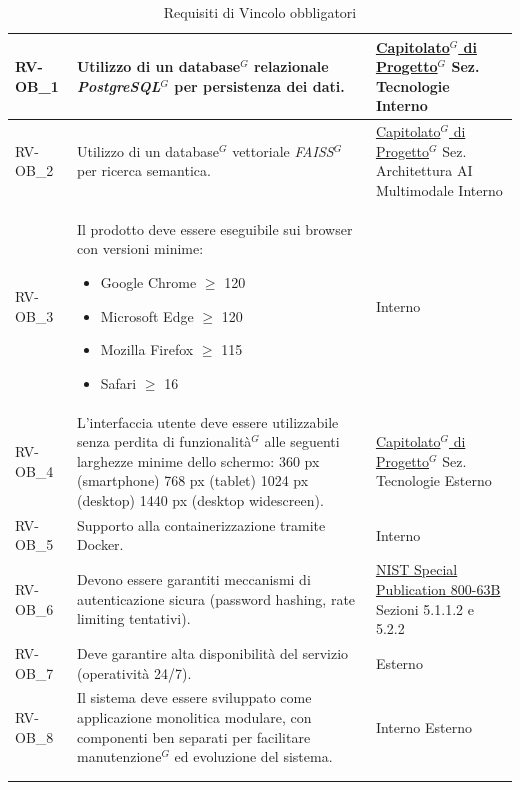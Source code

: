 \begin{longtable}{|>{\raggedright}p{}|>{\raggedright\arraybackslash}p{}|>{\raggedright\arraybackslash}p{}|}
    RV-OB\_1 & Utilizzo di un database$^G$ relazionale \textit{PostgreSQL$^G$} per persistenza dei dati. &  \href{https://www.math.unipd.it/~tullio/IS-1/2025/Progetto/C8.pdf}{Capitolato$^G$ di Progetto$^G$} \newline Sez. Tecnologie \newline Interno \\
    \hline
    RV-OB\_2 & Utilizzo di un database$^G$ vettoriale \textit{FAISS$^G$} per ricerca semantica. & \href{https://www.math.unipd.it/~tullio/IS-1/2025/Progetto/C8.pdf}{Capitolato$^G$ di Progetto$^G$} \newline Sez. Architettura AI Multimodale \newline Interno \\
    \hline
    RV-OB\_3 & Il prodotto deve essere eseguibile sui browser con versioni minime: \begin{itemize}
        \item Google Chrome $\ge$ 120
        \item Microsoft Edge $\ge$ 120
        \item Mozilla Firefox $\ge$ 115
        \item Safari $\ge$ 16
    \end{itemize} & Interno \\
    \hline
    RV-OB\_4 & L'interfaccia utente deve essere utilizzabile senza perdita di funzionalità$^G$ alle seguenti larghezze minime dello schermo: 360 px (smartphone) 768 px (tablet) 1024 px (desktop) 1440 px (desktop widescreen). &  \href{https://www.math.unipd.it/~tullio/IS-1/2025/Progetto/C8.pdf}{Capitolato$^G$ di Progetto$^G$} \newline Sez. Tecnologie \newline Esterno \\
    \hline
    RV-OB\_5 & Supporto alla containerizzazione tramite Docker. & Interno \\
    \hline
    RV-OB\_6 & Devono essere garantiti meccanismi di autenticazione sicura (password hashing, rate limiting tentativi). & \href{https://pages.nist.gov/800-63-3/sp800-63b.html#sfcs}{NIST Special Publication 800-63B} Sezioni 5.1.1.2 e 5.2.2 \\
    \hline
    RV-OB\_7 & Deve garantire alta disponibilità del servizio (operatività 24/7). & Esterno \\
    \hline
    RV-OB\_8 & Il sistema deve essere sviluppato come applicazione monolitica modulare, con componenti ben separati per facilitare manutenzione$^G$ ed evoluzione del sistema. & Interno \newline Esterno \\
    \hline
    
    \multicolumn{3}{c}{} \\
    \caption{Requisiti di Vincolo obbligatori}\label{tab:vincolo_obbligatori}\\
\end{longtable}
